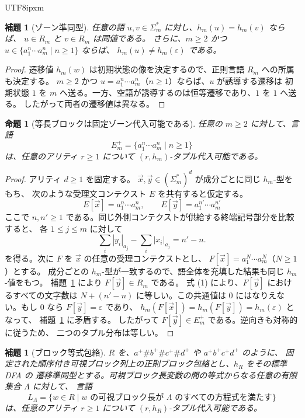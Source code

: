 \documentclass[10pt,a4paper]{article}
\newtheorem{lemma}[theorem]{補題}
\newtheorem{proposition}[theorem]{命題}
\theoremstyle{remark}
\newcommand{\tuple}[1]{\vec{#1}}
\newcommand{\eps}{\varepsilon}
\begin{document}
\begin{CJK}{UTF8}{ipxm}
\begin{lemma}[ゾーン準同型]
\label{lem:zone-morphism-basic-v10}
任意の語 \(u,v\in\Sigma_m^*\) に対し、\(h_m(u)=h_m(v)\) ならば、
\(u\in R_m\) と \(v\in R_m\) は同値である。
さらに、\(m\ge2\) かつ
\(u\in\{a_1^n\cdots a_m^n\mid n\ge1\}\) ならば、
\(h_m(u)\ne h_m(\eps)\) である。
\end{lemma}

\begin{proof}
遷移値 \(h_m(w)\) は初期状態の像を決定するので、正則言語 \(R_m\) への所属も決定する。
\(m\ge2\) かつ \(u=a_1^n\cdots a_m^n\)（\(n\ge1\)）ならば、\(u\) が誘導する遷移は
初期状態 \(1\) を \(m\) へ送る。一方、空語が誘導するのは恒等遷移であり、\(1\) を \(1\) へ送る。
したがって両者の遷移値は異なる。
\end{proof}

\begin{proposition}[等長ブロックは固定ゾーン代入可能である]
\label{prop:equality-block-substitutable-v10}
任意の \(m\ge2\) に対して、言語
\[
  E_m^+=\{a_1^n\cdots a_m^n\mid n\ge1\}
\]
は、任意のアリティ \(r\ge1\) について \((r,h_m)\)-タプル代入可能である。
\end{proposition}

\begin{proof}
アリティ \(d\ge1\) を固定する。
\(\tuple x,\tuple y\in(\Sigma_m^*)^d\) が成分ごとに同じ \(h_m\)-型をもち、
次のような受理文コンテクスト \(E\) を共有すると仮定する。
\[
  E[\tuple x]=a_1^n\cdots a_m^n,
  \qquad
  E[\tuple y]=a_1^{n'}\cdots a_m^{n'}
\]
ここで \(n,n'\ge1\) である。同じ外側コンテクストが供給する終端記号部分を比較すると、
各 \(1\le j\le m\) に対して
\[
  \sum_i |y_i|_{a_j}-\sum_i |x_i|_{a_j}=n'-n .             \tag{1}
\]
を得る。次に \(F\) を \(\tuple x\) の任意の受理コンテクストとし、
\(F[\tuple x]=a_1^N\cdots a_m^N\)（\(N\ge1\)）とする。
成分ごとの \(h_m\)-型が一致するので、語全体を充填した結果も同じ \(h_m\)-値をもつ。
補題~\ref{lem:zone-morphism-basic-v10} により \(F[\tuple y]\in R_m\) である。
式 (1) により、\(F[\tuple y]\) におけるすべての文字数は
\(N+(n'-n)\) に等しい。この共通値は 0 にはなりえない。もし 0 なら
\(F[\tuple y]=\eps\) であり、
\(h_m(F[\tuple x])=h_m(F[\tuple y])=h_m(\eps)\) となって、
補題~\ref{lem:zone-morphism-basic-v10} に矛盾する。
したがって \(F[\tuple y]\in E_m^+\) である。逆向きも対称的に従うため、
二つのタプル分布は等しい。
\end{proof}

\begin{lemma}[ブロック等式包絡]
\label{lem:block-equality-envelopes-v10}
\(R\) を、\(a^+\#b^+\#c^+\#d^+\) や \(a^+b^+c^+d^+\) のように、
固定された順序付き可視ブロック列上の正則ブロック包絡とし、\(h_R\) をその標準 DFA の
遷移準同型とする。可視ブロック長変数の間の等式からなる任意の有限集合 \(\Lambda\) に対して、
言語
\[
  L_\Lambda=\{w\in R\mid
  \text{\(w\) の可視ブロック長が \(\Lambda\) のすべての方程式を満たす}\}
\]
は、任意のアリティ \(r\ge1\) について \((r,h_R)\)-タプル代入可能である。
\end{lemma}


\end{CJK}
\end{document}

